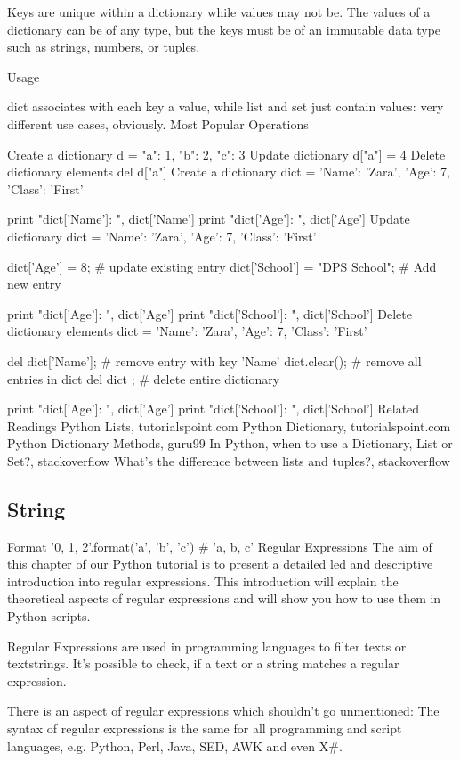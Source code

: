 Keys are unique within a dictionary while values may not be. The values of a dictionary can be of any type, but the keys must be of an immutable data type such as strings, numbers, or tuples.

Usage

dict associates with each key a value, while list and set just contain values: very different use cases, obviously.
Most Popular Operations

Create a dictionary
d = {"a": 1, "b": 2, "c": 3}
Update dictionary
d["a"] = 4
Delete dictionary elements
del d["a"]
Create a dictionary
dict = {'Name': 'Zara', 'Age': 7, 'Class': 'First'}

print "dict['Name']: ", dict['Name']
print "dict['Age']: ", dict['Age']
Update dictionary
dict = {'Name': 'Zara', 'Age': 7, 'Class': 'First'}

dict['Age'] = 8; # update existing entry
dict['School'] = "DPS School"; # Add new entry


print "dict['Age']: ", dict['Age']
print "dict['School']: ", dict['School']
Delete dictionary elements
dict = {'Name': 'Zara', 'Age': 7, 'Class': 'First'}

del dict['Name']; # remove entry with key 'Name'
dict.clear();     # remove all entries in dict
del dict ;        # delete entire dictionary

print "dict['Age']: ", dict['Age']
print "dict['School']: ", dict['School']
Related Readings
Python Lists, tutorialspoint.com
Python Dictionary, tutorialspoint.com
Python Dictionary Methods, guru99
In Python, when to use a Dictionary, List or Set?, stackoverflow
What's the difference between lists and tuples?, stackoverflow

\subsection{String}

Format
'{0}, {1}, {2}'.format('a', 'b', 'c')
# 'a, b, c'
Regular Expressions
The aim of this chapter of our Python tutorial is to present a detailed led and descriptive introduction into regular expressions. This introduction will explain the theoretical aspects of regular expressions and will show you how to use them in Python scripts.

Regular Expressions are used in programming languages to filter texts or textstrings. It's possible to check, if a text or a string matches a regular expression.

There is an aspect of regular expressions which shouldn't go unmentioned: The syntax of regular expressions is the same for all programming and script languages, e.g. Python, Perl, Java, SED, AWK and even X#.

